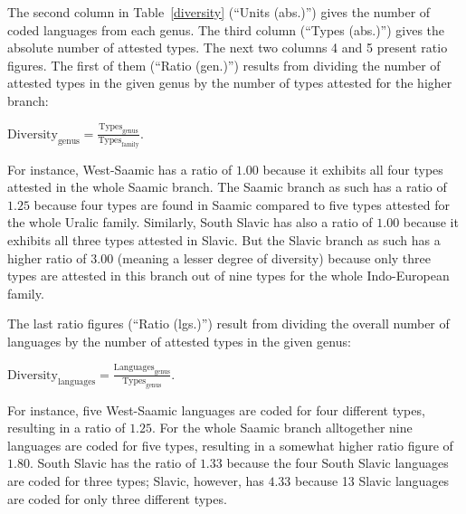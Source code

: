 The second column in Table~\ref{diversity} (“Units (abs.)”) gives the number of coded languages from each genus. The third column (“Types (abs.)”) gives the absolute number of attested types. The next two columns 4 and 5 present ratio figures. The first of them (“Ratio (gen.)”) results from dividing the number of attested types in the given genus by the number of types attested for the higher branch:\medskip

$\text{Diversity}_{\text{genus}} = \frac{\text{Types}_{\text{genus}}}{\text{Types}_{\text{family}}}$.\medskip

\noindent For instance, West-Saamic has a ratio of $1.00$ because it exhibits all four types attested in the whole Saamic branch. The Saamic branch as such has a ratio of $1.25$ because four types are found in Saamic compared to five types attested for the whole Uralic family. Similarly, South Slavic has also a ratio of $1.00$ because it exhibits all three types attested in Slavic. But the Slavic branch as such has a higher ratio of $3.00$ (meaning a lesser degree of diversity) because only three types are attested in this branch out of nine types for the whole Indo-European family. 

The last ratio figures (“Ratio (lgs.)”) result from dividing the overall number of languages by the number of attested types in the given genus:\medskip

$\text{Diversity}_{\text{languages}} = \frac{\text{Languages}_{\text{genus}}}{\text{Types}_{\text{genus}}}$.\medskip

\noindent For instance, five West-Saamic languages are coded for four different types, resulting in a ratio of $1.25$. For the whole Saamic branch alltogether nine languages are coded for five types, resulting in a somewhat higher ratio figure of $1.80$. South Slavic has the ratio of $1.33$ because the four South Slavic languages are coded for three types; Slavic, however, has $4.33$ because 13 Slavic languages are coded for only three different types.

